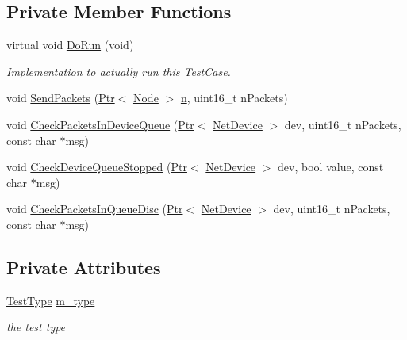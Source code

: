 \subsection*{Private Member Functions}
\begin{DoxyCompactItemize}
\item 
virtual void \hyperlink{classTcFlowControlTestCase_a671ac2565d04fd5618e2743289d1b707}{Do\+Run} (void)
\begin{DoxyCompactList}\small\item\em Implementation to actually run this Test\+Case. \end{DoxyCompactList}\item 
void \hyperlink{classTcFlowControlTestCase_a88bdf76e668d4e9b1edcce980768c96e}{Send\+Packets} (\hyperlink{classns3_1_1Ptr}{Ptr}$<$ \hyperlink{classns3_1_1Node}{Node} $>$ \hyperlink{lte__link__budget__x2__handover__measures_8m_abdb05bc5a064cf642a06c83b3392f148}{n}, uint16\+\_\+t n\+Packets)
\item 
void \hyperlink{classTcFlowControlTestCase_a7ad467b39fdb155daea4b048619f6d12}{Check\+Packets\+In\+Device\+Queue} (\hyperlink{classns3_1_1Ptr}{Ptr}$<$ \hyperlink{classns3_1_1NetDevice}{Net\+Device} $>$ dev, uint16\+\_\+t n\+Packets, const char $\ast$msg)
\item 
void \hyperlink{classTcFlowControlTestCase_a4ccc9564c9142984fa8041f67b4a518a}{Check\+Device\+Queue\+Stopped} (\hyperlink{classns3_1_1Ptr}{Ptr}$<$ \hyperlink{classns3_1_1NetDevice}{Net\+Device} $>$ dev, bool value, const char $\ast$msg)
\item 
void \hyperlink{classTcFlowControlTestCase_ac6d0b6a74dd29a21369bf1d26795098d}{Check\+Packets\+In\+Queue\+Disc} (\hyperlink{classns3_1_1Ptr}{Ptr}$<$ \hyperlink{classns3_1_1NetDevice}{Net\+Device} $>$ dev, uint16\+\_\+t n\+Packets, const char $\ast$msg)
\end{DoxyCompactItemize}
\subsection*{Private Attributes}
\begin{DoxyCompactItemize}
\item 
\hyperlink{classTcFlowControlTestCase_a63146d60b911dd039c9cf960cbddb458}{Test\+Type} \hyperlink{classTcFlowControlTestCase_a48b76fa61206d08fadd399b379bdbf56}{m\+\_\+type}
\begin{DoxyCompactList}\small\item\em the test type \end{DoxyCompactList}\end{DoxyCompactItemize}
